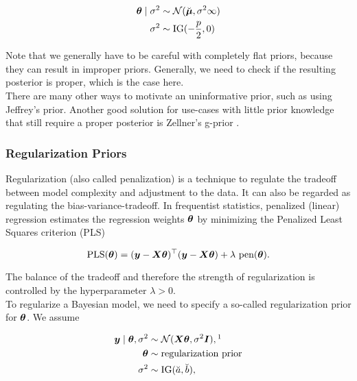 \begin{equation} \label{eq:flat-prior}
    \begin{aligned}
        \bm{\theta} \mid \sigma^2 &\sim  \mathcal{N}(\breve{\bm{\mu}}, \sigma^2 \infty)\\
        \sigma^2 &\sim \text{IG}(-\frac{p}{2},  0)
    \end{aligned}
\end{equation}

Note that we generally have to be careful with completely flat priors, because they can result in improper priors.
Generally, we need to check if the resulting posterior is proper, which is the case here. \\

There are many other ways to motivate an uninformative prior, such as using Jeffrey's prior.
Another good solution for use-cases with little prior knowledge that still require a proper posterior is Zellner's g-prior \citep{zellner_assessing_1986}.

\subsubsection*{Regularization Priors}

Regularization (also called penalization) is a technique to regulate the tradeoff between model complexity and adjustment to the data.
It can also be regarded as regulating the bias-variance-tradeoff. 
In frequentist statistics, penalized (linear) regression estimates the regression weights $\bm{\theta}$ by minimizing the Penalized Least Squares criterion (PLS) 

\begin{equation*}
    \text{PLS}(\btheta) = (\by - \bX \btheta)^\top (\by - \bX \btheta) + \lambda \ \text{pen}(\btheta).
\end{equation*}

The balance of the tradeoff and therefore the strength of regularization is controlled by the hyperparameter $\lambda > 0$. \\

To regularize a Bayesian model, we need to specify a so-called regularization prior for $\bm{\theta}$. We assume

\begin{equation}
    \begin{aligned}
        \by \mid \btheta, \ssd &\sim \Ncal(\bX \btheta, \ssd \bI),\footnotemark \\
        \btheta &\sim \text{regularization prior}\\
        \ssd &\sim \IG(\apri, \bpri),
    \end{aligned}
\end{equation}

